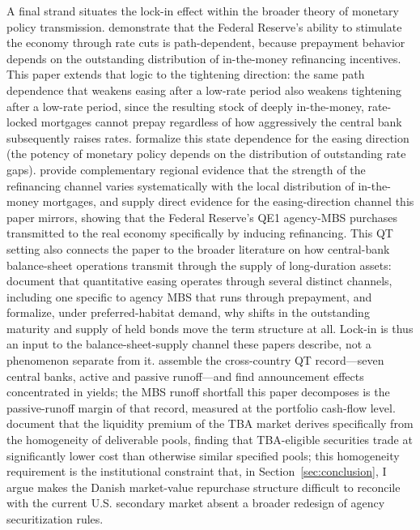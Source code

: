 \documentclass[12pt]{article}
\begin{document}
A final strand situates the lock-in effect within the broader theory of monetary policy transmission. \citet{berger2021} demonstrate that the Federal Reserve's ability to stimulate the economy through rate cuts is path-dependent, because prepayment behavior depends on the outstanding distribution of in-the-money refinancing incentives. This paper extends that logic to the tightening direction: the same path dependence that weakens easing after a low-rate period also weakens tightening after a low-rate period, since the resulting stock of deeply in-the-money, rate-locked mortgages cannot prepay regardless of how aggressively the central bank subsequently raises rates. \citet{eichenbaum2022} formalize this state dependence for the easing direction (the potency of monetary policy depends on the distribution of outstanding rate gaps). \citet{beraja2019} provide complementary regional evidence that the strength of the refinancing channel varies systematically with the local distribution of in-the-money mortgages, and \citet{dimaggio2020} supply direct evidence for the easing-direction channel this paper mirrors, showing that the Federal Reserve's QE1 agency-MBS purchases transmitted to the real economy specifically by inducing refinancing. This QT setting also connects the paper to the broader literature on how central-bank balance-sheet operations transmit through the supply of long-duration assets: \citet{krishnamurthy2011} document that quantitative easing operates through several distinct channels, including one specific to agency MBS that runs through prepayment, and \citet{vayanos2021} formalize, under preferred-habitat demand, why shifts in the outstanding maturity and supply of held bonds move the term structure at all. Lock-in is thus an input to the balance-sheet-supply channel these papers describe, not a phenomenon separate from it. \citet{du2024} assemble the cross-country QT record---seven central banks, active and passive runoff---and find announcement effects concentrated in yields; the MBS runoff shortfall this paper decomposes is the passive-runoff margin of that record, measured at the portfolio cash-flow level. \citet{vickery2013} document that the liquidity premium of the TBA market derives specifically from the homogeneity of deliverable pools, finding that TBA-eligible securities trade at significantly lower cost than otherwise similar specified pools; this homogeneity requirement is the institutional constraint that, in Section~\ref{sec:conclusion}, I argue makes the Danish market-value repurchase structure difficult to reconcile with the current U.S. secondary market absent a broader redesign of agency securitization rules.
\end{document}
